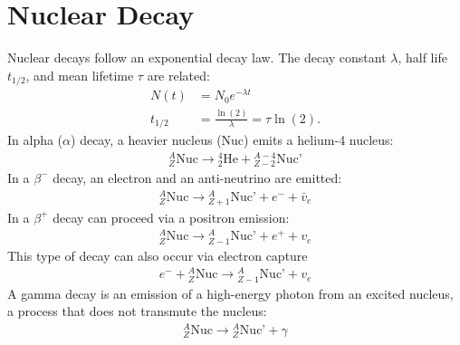 \section{Nuclear Decay}
\begin{multicols}{2}
Nuclear decays follow an exponential decay law. The decay constant $\lambda$, half life $t_{1/2}$, and mean lifetime $\tau$ are related:
\begin{align}
N(t)&=N_0e^{-\lambda t}\\
t_{1/2}&=\frac{\ln(2)}{\lambda}=\tau \ln(2).
\end{align}
In alpha ($\alpha$) decay, a heavier nucleus (Nuc) emits a helium-4 nucleus:
\begin{align}
{}^A_Z\textrm{Nuc} \to {}^{4}_{2}\textrm{He} + {}^{A-4}_{Z-2}\textrm{Nuc'}
\end{align}
In a $\beta^-$ decay, an electron and an anti-neutrino are emitted:
\begin{align}
{}^A_Z\textrm{Nuc} \to {}^{A}_{Z+1}\textrm{Nuc'} + e^- +\bar{v}_e
\end{align}
In a $\beta^+$ decay can proceed via a positron emission:
\begin{align}
{}^A_Z\textrm{Nuc} \to {}^{A}_{Z-1}\textrm{Nuc'} + e^+ +v_e
\end{align}
This type of decay can also occur via electron capture
\begin{align}
e^-+{}^A_Z\textrm{Nuc} \to {}^{A}_{Z-1}\textrm{Nuc'} +v_e
\end{align}
A gamma decay is an emission of a high-energy photon from an excited nucleus, a process that does not transmute the nucleus:
\begin{align}
{}^A_Z\textrm{Nuc} \to {}^{A}_{Z}\textrm{Nuc'} +\gamma
\end{align}
\end{multicols}



